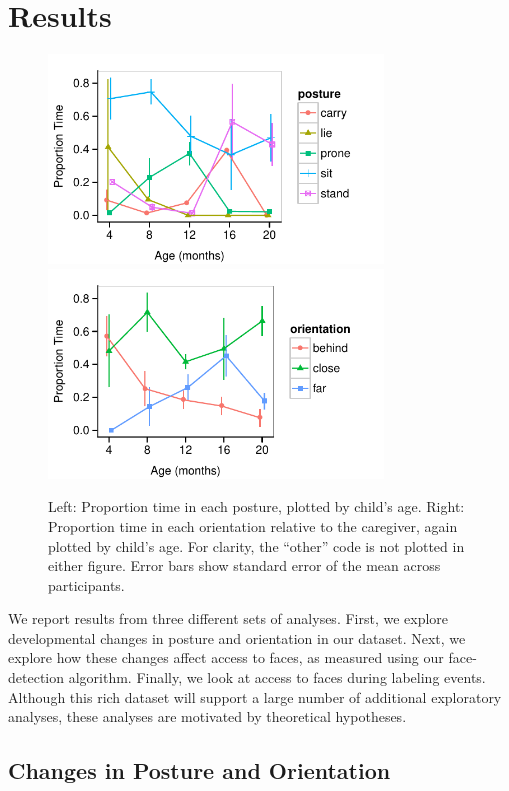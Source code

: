 \documentclass[10pt,letterpaper]{article}
\begin{document}
\section{Results}


\begin{figure}[t]
\includegraphics[width=3.5in]{figures/posture.pdf}
\includegraphics[width=3.5in]{figures/orientation.pdf}
\caption{\label{fig:posture} Left: Proportion time in each posture, plotted by child's age. Right: Proportion time in each orientation relative to the caregiver, again plotted by child's age. For clarity, the ``other'' code is not plotted in either figure. Error bars show standard error of the mean across participants.} 
\end{figure}

We report results from three different sets of analyses. First, we explore developmental changes in posture and orientation in our dataset. Next, we explore how these changes affect access to faces, as measured using our face-detection algorithm. Finally, we look at access to faces during labeling events. Although this rich dataset will support a large number of additional exploratory analyses, these analyses are motivated by theoretical hypotheses. 

\subsection{Changes in Posture and Orientation}
 
\end{document}
